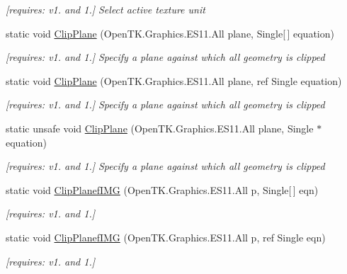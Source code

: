\begin{DoxyCompactItemize}
\begin{DoxyCompactList}\small\item\em \mbox{[}requires\-: v1. and 1.\mbox{]} Select active texture unit \end{DoxyCompactList}\item 
static void \hyperlink{class_open_t_k_1_1_graphics_1_1_e_s11_1_1_g_l_a95e9c9439c114f6e2283670044cc6faf}{Clip\-Plane} (Open\-T\-K.\-Graphics.\-E\-S11.\-All plane, Single\mbox{[}$\,$\mbox{]} equation)
\begin{DoxyCompactList}\small\item\em \mbox{[}requires\-: v1. and 1.\mbox{]} Specify a plane against which all geometry is clipped \end{DoxyCompactList}\item 
static void \hyperlink{class_open_t_k_1_1_graphics_1_1_e_s11_1_1_g_l_ae1a3bd0caeed444540117f339a6e4851}{Clip\-Plane} (Open\-T\-K.\-Graphics.\-E\-S11.\-All plane, ref Single equation)
\begin{DoxyCompactList}\small\item\em \mbox{[}requires\-: v1. and 1.\mbox{]} Specify a plane against which all geometry is clipped \end{DoxyCompactList}\item 
static unsafe void \hyperlink{class_open_t_k_1_1_graphics_1_1_e_s11_1_1_g_l_a0da8d7c3a32dffd4b3e37693842958e3}{Clip\-Plane} (Open\-T\-K.\-Graphics.\-E\-S11.\-All plane, Single $\ast$equation)
\begin{DoxyCompactList}\small\item\em \mbox{[}requires\-: v1. and 1.\mbox{]} Specify a plane against which all geometry is clipped \end{DoxyCompactList}\item 
static void \hyperlink{class_open_t_k_1_1_graphics_1_1_e_s11_1_1_g_l_a606cf18301c3c201e938edc862f7e259}{Clip\-Planef\-I\-M\-G} (Open\-T\-K.\-Graphics.\-E\-S11.\-All p, Single\mbox{[}$\,$\mbox{]} eqn)
\begin{DoxyCompactList}\small\item\em \mbox{[}requires\-: v1. and 1.\mbox{]}\end{DoxyCompactList}\item 
static void \hyperlink{class_open_t_k_1_1_graphics_1_1_e_s11_1_1_g_l_a492cce9d18dc2c17529e59c144baeace}{Clip\-Planef\-I\-M\-G} (Open\-T\-K.\-Graphics.\-E\-S11.\-All p, ref Single eqn)
\begin{DoxyCompactList}\small\item\em \mbox{[}requires\-: v1. and 1.\mbox{]}\end{DoxyCompactList}\item 

\end{DoxyCompactItemize}
